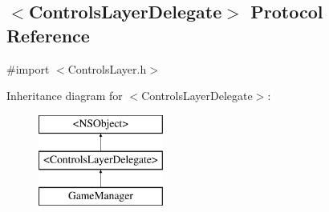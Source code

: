 \hypertarget{protocol_controls_layer_delegate-p}{\subsection{$<$Controls\-Layer\-Delegate$>$ Protocol Reference}
\label{db/d3c/protocol_controls_layer_delegate-p}
}


{\ttfamily \#import $<$Controls\-Layer.\-h$>$}

Inheritance diagram for $<$Controls\-Layer\-Delegate$>$\-:\begin{figure}[H]
\begin{center}
\leavevmode
\includegraphics[height=3.000000cm]{db/d3c/protocol_controls_layer_delegate-p}
\end{center}
\end{figure}
